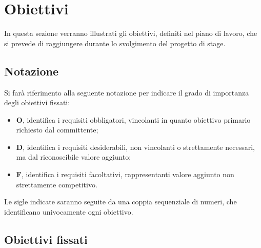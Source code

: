 \section{Obiettivi}
\label{sec:obiettivi}

In questa sezione verranno illustrati gli obiettivi, definiti nel piano di lavoro, che si prevede di raggiungere durante lo svolgimento del progetto di stage.\\

\subsection{Notazione}
\label{subsec:notazione}

Si farà riferimento alla seguente notazione per indicare il grado di importanza degli obiettivi fissati:
\begin{itemize}
    \item \textbf{O}, identifica i requisiti obbligatori, vincolanti in quanto obiettivo primario richiesto dal committente;
    \item \textbf{D}, identifica i requisiti desiderabili, non vincolanti o strettamente necessari, ma dal riconoscibile valore aggiunto;
    \item \textbf{F}, identifica i requisiti facoltativi, rappresentanti valore aggiunto non strettamente competitivo.
\end{itemize}
Le sigle indicate saranno seguite da una coppia sequenziale di numeri, che identificano univocamente ogni obiettivo.

\subsection{Obiettivi fissati}
\label{subsec:obiettivi-fissati}

